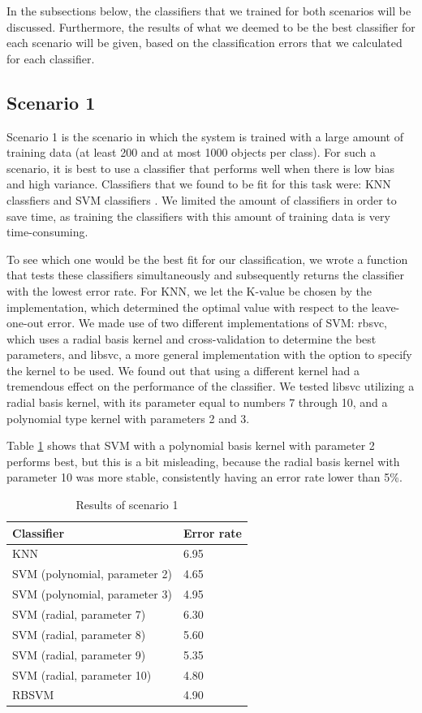 \documentclass[11pt,twoside,a4paper]{article}
\begin{document}
In the subsections below, the classifiers that we trained for both scenarios will be discussed. Furthermore, the results of what we deemed to be the best classifier for each scenario will be given, based on the classification errors that we calculated for each classifier.
\subsection{Scenario 1}
Scenario 1 is the scenario in which the system is trained with a large amount of training data (at least 200 and at most 1000 objects per class). For such a scenario, it is best to use a classifier that performs well when there is low bias and high variance. Classifiers that we found to be fit for this task were: KNN classfiers and SVM classifiers \cite{liu2003handwritten}. We limited the amount of classifiers in order to save time, as training the classifiers with this amount of training data is very time-consuming.

To see which one would be the best fit for our classification, we wrote a function that tests these classifiers simultaneously and subsequently returns the classifier with the lowest error rate. For KNN, we let the K-value be chosen by the implementation, which determined the optimal value with respect to the leave-one-out error. We made use of two different implementations of SVM: rbsvc, which uses a radial basis kernel and cross-validation to determine the best parameters, and libsvc, a more general implementation with the option to specify the kernel to be used. We found out that using a different kernel had a tremendous effect on the performance of the classifier. We tested libsvc utilizing a radial basis kernel, with its parameter equal to numbers 7 through 10, and a polynomial type kernel with parameters 2 and 3.

Table \ref{table:scenario1} shows that SVM with a polynomial basis kernel with parameter 2 performs best, but this is a bit misleading, because the radial basis kernel with parameter 10 was more stable, consistently having an error rate lower than 5\%.

\begin{table}[h]
\centering
    \begin{tabular}{ll}
    Classifier                    & Error rate \\ \hline
    KNN                           & 6.95       \\
    SVM (polynomial, parameter 2) & 4.65       \\
    SVM (polynomial, parameter 3) & 4.95       \\
    SVM (radial, parameter 7)     & 6.30       \\
    SVM (radial, parameter 8)     & 5.60       \\
    SVM (radial, parameter 9)     & 5.35       \\
    SVM (radial, parameter 10)    & 4.80       \\
    RBSVM                         & 4.90       \\
    \end{tabular}
    \caption{Results of scenario 1}
    \label{table:scenario1}
\end{table}
\end{document}
